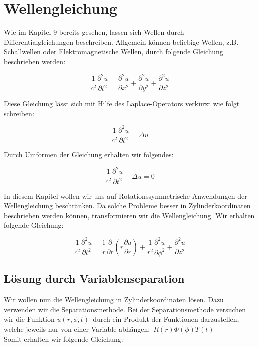\section{Wellengleichung}

Wie im Kapitel 9 bereits gesehen, lassen sich Wellen durch Differentialgleichungen beschreiben. Allgemein können beliebige Wellen, z.B. Schallwellen oder Elektromagnetische Wellen, durch folgende Gleichung beschrieben werden:

\begin{equation}
\frac{1}{c^2} \frac{\partial^2 u}{\partial t^2} = \frac{\partial^2 u}{\partial x^2} + \frac{\partial^2 u}{\partial y^2} + \frac{\partial^2 u}{\partial z^2}
\end{equation}

Diese Gleichung lässt sich mit Hilfe des Laplace-Operators verkürzt wie folgt schreiben:

\begin{equation}
\frac{1}{c^2} \frac{\partial^2 u}{\partial t^2} = \Delta u
\end{equation}

Durch Umformen der Gleichung erhalten wir folgendes:

\begin{equation}
\frac{1}{c^2} \frac{\partial^2 u}{\partial t^2} - \Delta u = 0
\end{equation}

In diesem Kapitel wollen wir uns auf Rotationssymmetrische Anwendungen der Wellengleichung beschränken. Da solche Probleme besser in Zylinderkoordinaten beschrieben werden können, transformieren wir die Wellengleichung. Wir erhalten folgende Gleichung:

\begin{equation}
\frac{1}{c^2} \frac{\partial^2 u}{\partial t^2} = \frac{1}{r} \frac{\partial}{\partial r}(r \frac{\partial u}{\partial r}) + \frac{1}{r^2} \frac{\partial^2 u}{\partial \phi^2} + \frac{\partial^2 u}{\partial z^2} 
\end{equation}

\subsection[Lösung durch Variablenseparation]{Lösung durch Variablenseparation}

Wir wollen nun die Wellengleichung in Zylinderkoordinaten lösen. Dazu verwenden wir die Separationsmethode.
Bei der Separationsmethode versuchen wir die Funktion $u(r, \phi, t)$ durch ein Produkt der Funktionen darzustellen, welche jeweils nur von einer Variable abhängen: $R(r)\Phi(\phi)T(t)$
\\Somit erhalten wir folgende Gleichung:

